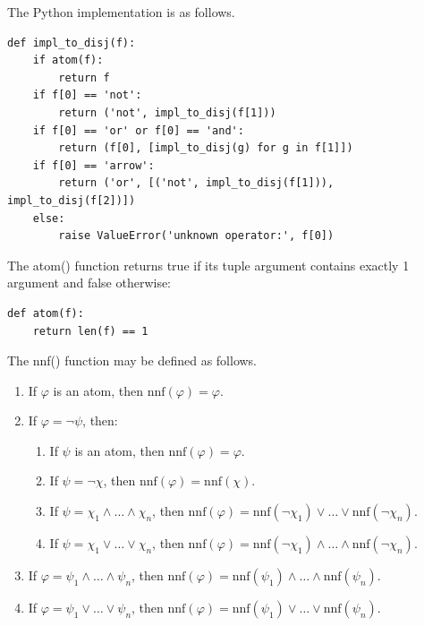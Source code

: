 \documentclass[a4paper,notitlepage]{scrartcl}
\let\phi\varphi
\begin{document}
\noindent
The Python implementation is as follows.

\begin{verbatim}
def impl_to_disj(f):
    if atom(f):
        return f
    if f[0] == 'not':
        return ('not', impl_to_disj(f[1]))
    if f[0] == 'or' or f[0] == 'and':
        return (f[0], [impl_to_disj(g) for g in f[1]])
    if f[0] == 'arrow':
        return ('or', [('not', impl_to_disj(f[1])), impl_to_disj(f[2])])
    else:
        raise ValueError('unknown operator:', f[0])
\end{verbatim}

\noindent
The atom() function returns true if its tuple argument contains exactly 1
argument and false otherwise:

\begin{verbatim}
def atom(f):
    return len(f) == 1
\end{verbatim}

The nnf() function may be defined as follows.

\begin{enumerate}

\item
If $\phi$ is an atom, then $\mathrm{nnf}(\phi) = \phi$.

\item
If $\phi = \lnot\psi$, then:

\begin{enumerate}

\item
If $\psi$ is an atom, then $\mathrm{nnf}(\phi) = \phi$.

\item
If $\psi = \lnot\chi$, then $\mathrm{nnf}(\phi) = \mathrm{nnf}(\chi)$.

\item
If $\psi = \chi_1 \land \ldots \land \chi_n$, then $\mathrm{nnf}(\phi) =
\mathrm{nnf}(\lnot\chi_1) \lor \ldots \lor \mathrm{nnf}(\lnot\chi_n)$.

\item
If $\psi = \chi_1 \lor \ldots \lor \chi_n$, then $\mathrm{nnf}(\phi) =
\mathrm{nnf}(\lnot\chi_1) \land \ldots \land \mathrm{nnf}(\lnot\chi_n)$.

\end{enumerate}

\item
If $\phi = \psi_1 \land \ldots \land \psi_n$, then $\mathrm{nnf}(\phi) =
\mathrm{nnf}(\psi_1) \land \ldots \land \mathrm{nnf}(\psi_n)$.

\item
If $\phi = \psi_1 \lor \ldots \lor \psi_n$, then $\mathrm{nnf}(\phi) =
\mathrm{nnf}(\psi_1) \lor \ldots \lor \mathrm{nnf}(\psi_n)$.

\end{enumerate}
\end{document}
